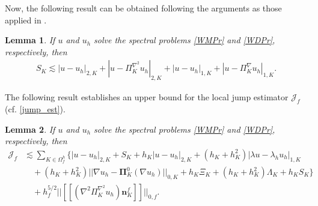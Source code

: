 \documentclass[final,reqno]{elsarticle}
\newtheorem{lemma}{Lemma}[section]
\newcommand\cJ{\mathcal{J}}
\def\bPi{\mathbf{\Pi}}
\begin{document}
Now, the following result can be obtained following the arguments as those applied in \cite[Lemma~19]{dassi2025posteriorierrorestimatesc1}.
\begin{lemma}\label{ApVEPLem19}
    If  $u$ and $u_h$ solve the spectral problems \eqref{WMPr} and \eqref{WDPr}, respectively,  then
	\begin{align*}
		S_K\lesssim |u-u_h|_{2,K}+|u-\Pi_K^{\nabla^2}  u_h|_{2,K} + |u-u_h|_{1,K} + |u-\Pi_K^{\nabla}u_h|_{1,K}.
	\end{align*}
\end{lemma}

The following result establishes an upper bound for the local jump estimator $\cJ_{f}$ (cf. \eqref{jump_est}).
\begin{lemma}\label{ApVEPLem20}
	If  $u$ and $u_h$ solve the spectral problems \eqref{WMPr} and \eqref{WDPr}, respectively,  then 
	\begin{align*}
		\cJ_{f}&\lesssim \sum\limits_{K\in \Omega^h_f} \Big\{ |u-u_h|_{2,K} + S_K + h_K |u-u_h|_{2,K} + (h_K + h_K^2)|\lambda u -\lambda_h u_h |_{1,K} \nonumber\\
    &\quad + (h_K + h_K^2)||\nabla u_h - \bPi_K^0 (\nabla u_h)||_{0,K} + h_K\Xi_K + (h_K+h_K^2)\Lambda_K + h_K S_K \bigg\} \nonumber\\
    &\quad + h_f^{5/2}||[\![(\nabla^2\Pi_K^{\nabla^2} u_h )\boldsymbol{n}_K^{f}]\!]||_{0,f}.
	\end{align*}
\end{lemma}
\end{document}
